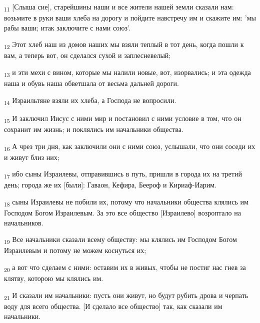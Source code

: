 \begin{tcolorbox}
\textsubscript{11} [Слыша сие], старейшины наши и все жители нашей земли сказали нам: возьмите в руки ваши хлеба на дорогу и пойдите навстречу им и скажите им: 'мы рабы ваши; итак заключите с нами союз'.
\end{tcolorbox}
\begin{tcolorbox}
\textsubscript{12} Этот хлеб наш из домов наших мы взяли теплый в тот день, когда пошли к вам, а теперь вот, он сделался сухой и заплесневелый;
\end{tcolorbox}
\begin{tcolorbox}
\textsubscript{13} и эти мехи с вином, которые мы налили новые, вот, изорвались; и эта одежда наша и обувь наша обветшала от весьма дальней дороги.
\end{tcolorbox}
\begin{tcolorbox}
\textsubscript{14} Израильтяне взяли их хлеба, а Господа не вопросили.
\end{tcolorbox}
\begin{tcolorbox}
\textsubscript{15} И заключил Иисус с ними мир и постановил с ними условие в том, что он сохранит им жизнь; и поклялись им начальники общества.
\end{tcolorbox}
\begin{tcolorbox}
\textsubscript{16} А чрез три дня, как заключили они с ними союз, услышали, что они соседи их и живут близ них;
\end{tcolorbox}
\begin{tcolorbox}
\textsubscript{17} ибо сыны Израилевы, отправившись в путь, пришли в города их на третий день; города же их [были]: Гаваон, Кефира, Беероф и Кириаф-Иарим.
\end{tcolorbox}
\begin{tcolorbox}
\textsubscript{18} сыны Израилевы не побили их, потому что начальники общества клялись им Господом Богом Израилевым. За это все общество [Израилево] возроптало на начальников.
\end{tcolorbox}
\begin{tcolorbox}
\textsubscript{19} Все начальники сказали всему обществу: мы клялись им Господом Богом Израилевым и потому не можем коснуться их;
\end{tcolorbox}
\begin{tcolorbox}
\textsubscript{20} а вот что сделаем с ними: оставим их в живых, чтобы не постиг нас гнев за клятву, которою мы клялись им.
\end{tcolorbox}
\begin{tcolorbox}
\textsubscript{21} И сказали им начальники: пусть они живут, но будут рубить дрова и черпать воду для всего общества. [И сделало все общество] так, как сказали им начальники.
\end{tcolorbox}
